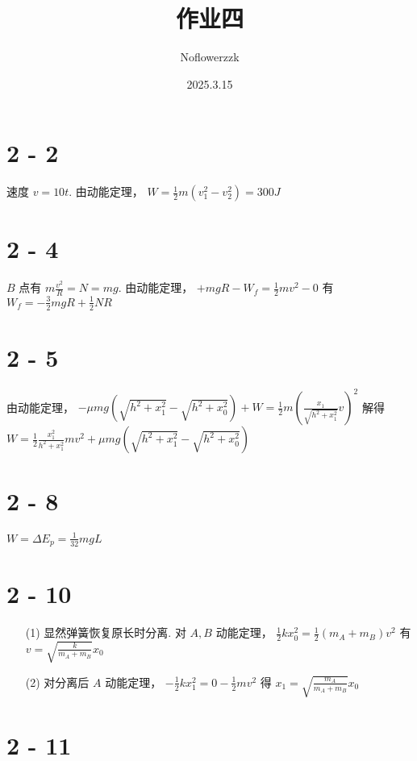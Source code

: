 \documentclass{article}
\title{作业四}
\author{Noflowerzzk}
\date{2025.3.15}
\begin{document}
\maketitle

\section*{2 - 2}

速度 $v = 10t$. 由动能定理， $W = \frac{1}{2}m(v_1^2 - v_2^2) = 300J$

\section*{2 - 4}

$B$ 点有 $m\frac{v^2}{R} = N = mg$. 由动能定理， $+mgR - W_f = \frac{1}{2}mv^2 - 0$ 有 $W_f = -\frac{3}{2}mgR + \frac{1}{2}NR$

\section*{2 - 5}

由动能定理， $-\mu mg \left(\sqrt{h^2 + x_1^2} - \sqrt{h^2 + x_0^2}\right) + W = \frac{1}{2}m\left(\frac{x_1}{\sqrt{h^2 + x_1^2}}v\right)^2$ 解得 $W = \frac{1}{2}\frac{x_1^2}{h^2 + x_1^2}mv^2 + \mu mg \left(\sqrt{h^2 + x_1^2} - \sqrt{h^2 + x_0^2}\right)$

\section*{2 - 8}

$W = \Delta E_p = \frac{1}{32}mgL$

\section*{2 - 10}

\begin{itemize}
    \item [(1)] 显然弹簧恢复原长时分离. 对 $A, B$ 动能定理， $\frac{1}{2}kx_0^2 = \frac{1}{2}(m_A + m_B)v^2$ 有 $v = \sqrt{\frac{k}{m_A + m_B}}x_0$
    \item [(2)] 对分离后 $A$ 动能定理， $-\frac{1}{2}kx_1^2 = 0 - \frac{1}{2}mv^2$ 得 $x_1 = \sqrt{\frac{m_A}{m_A + m_B}}x_0$
\end{itemize}

\section*{2 - 11}
\end{document}
